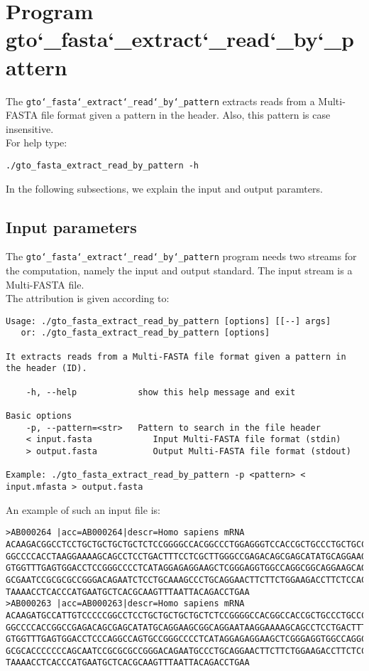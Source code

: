 \section{Program gto\char`_fasta\char`_extract\char`_read\char`_by\char`_pattern}
The \texttt{gto\char`_fasta\char`_extract\char`_read\char`_by\char`_pattern} extracts reads from a Multi-FASTA file format given a pattern in the header. Also, this pattern is case insensitive. \\
For help type:
\begin{lstlisting}
./gto_fasta_extract_read_by_pattern -h
\end{lstlisting}
In the following subsections, we explain the input and output paramters.

\subsection*{Input parameters}

The \texttt{gto\char`_fasta\char`_extract\char`_read\char`_by\char`_pattern} program needs two streams for the computation, namely the input and output standard. The input stream is a Multi-FASTA file.\\
The attribution is given according to:
\begin{lstlisting}
Usage: ./gto_fasta_extract_read_by_pattern [options] [[--] args]
   or: ./gto_fasta_extract_read_by_pattern [options]

It extracts reads from a Multi-FASTA file format given a pattern in the header (ID).

    -h, --help            show this help message and exit

Basic options
    -p, --pattern=<str>   Pattern to search in the file header
    < input.fasta            Input Multi-FASTA file format (stdin)
    > output.fasta           Output Multi-FASTA file format (stdout)

Example: ./gto_fasta_extract_read_by_pattern -p <pattern> < input.mfasta > output.fasta
\end{lstlisting}
An example of such an input file is:
\begin{lstlisting}
>AB000264 |acc=AB000264|descr=Homo sapiens mRNA 
ACAAGACGGCCTCCTGCTGCTGCTGCTCTCCGGGGCCACGGCCCTGGAGGGTCCACCGCTGCCCTGCTGCCATTGTCCCC
GGCCCCACCTAAGGAAAAGCAGCCTCCTGACTTTCCTCGCTTGGGCCGAGACAGCGAGCATATGCAGGAAGCGGCAGGAA
GTGGTTTGAGTGGACCTCCGGGCCCCTCATAGGAGAGGAAGCTCGGGAGGTGGCCAGGCGGCAGGAAGCAGGCCAGTGCC
GCGAATCCGCGCGCCGGGACAGAATCTCCTGCAAAGCCCTGCAGGAACTTCTTCTGGAAGACCTTCTCCACCCCCCCAGC
TAAAACCTCACCCATGAATGCTCACGCAAGTTTAATTACAGACCTGAA
>AB000263 |acc=AB000263|descr=Homo sapiens mRNA 
ACAAGATGCCATTGTCCCCCGGCCTCCTGCTGCTGCTGCTCTCCGGGGCCACGGCCACCGCTGCCCTGCCCCTGGAGGGT
GGCCCCACCGGCCGAGACAGCGAGCATATGCAGGAAGCGGCAGGAATAAGGAAAAGCAGCCTCCTGACTTTCCTCGCTTG
GTGGTTTGAGTGGACCTCCCAGGCCAGTGCCGGGCCCCTCATAGGAGAGGAAGCTCGGGAGGTGGCCAGGCGGCAGGAAG
GCGCACCCCCCCAGCAATCCGCGCGCCGGGACAGAATGCCCTGCAGGAACTTCTTCTGGAAGACCTTCTCCTCCTGCAAA
TAAAACCTCACCCATGAATGCTCACGCAAGTTTAATTACAGACCTGAA
\end{lstlisting}

